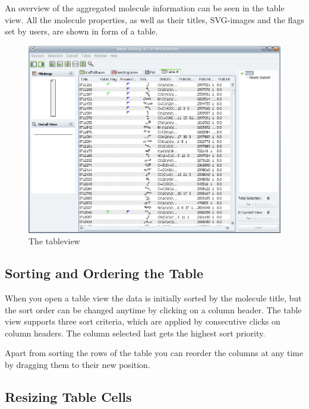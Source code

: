 An overview of the aggregated molecule information can be seen in
the table view. All the molecule properties, as well as their titles,
SVG-images and the flags set by users, are shown in form of a table.
%
\begin{figure}[!htb]
\begin{centering}
\includegraphics[width=0.8\columnwidth]{images/table/table_overview}
\par\end{centering}

\caption{The tableview}


%
\end{figure}



\subsection{Sorting and Ordering the Table}

When you open a table view the data is initially sorted by the molecule
title, but the sort order can be changed anytime by clicking on a
column header. The table view supports three sort criteria, which are
applied by consecutive clicks on column headers. The column selected last
gets the highest sort priority.

Apart from sorting the rows of the table you can reorder the columns
at any time by dragging them to their new position.


\subsection{Resizing Table Cells}


